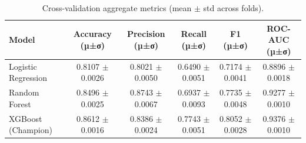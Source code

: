 \begin{table}[ht]
\centering
\small
\begin{tabular}{lccccc}
\toprule
Model & Accuracy (µ±σ) & Precision (µ±σ) & Recall (µ±σ) & F1 (µ±σ) & ROC-AUC (µ±σ) \\
\midrule
Logistic Regression & 0.8107 $\pm$ 0.0026 & 0.8021 $\pm$ 0.0050 & 0.6490 $\pm$ 0.0051 & 0.7174 $\pm$ 0.0041 & 0.8896 $\pm$ 0.0018 \\
Random Forest & 0.8496 $\pm$ 0.0025 & 0.8743 $\pm$ 0.0067 & 0.6937 $\pm$ 0.0093 & 0.7735 $\pm$ 0.0048 & 0.9277 $\pm$ 0.0010 \\
XGBoost (Champion) & 0.8612 $\pm$ 0.0016 & 0.8386 $\pm$ 0.0024 & 0.7743 $\pm$ 0.0051 & 0.8052 $\pm$ 0.0028 & 0.9376 $\pm$ 0.0010 \\
\bottomrule
\end{tabular}
\caption{Cross-validation aggregate metrics (mean $\pm$ std across folds).}
\label{tab:cv-metrics}
\end{table}